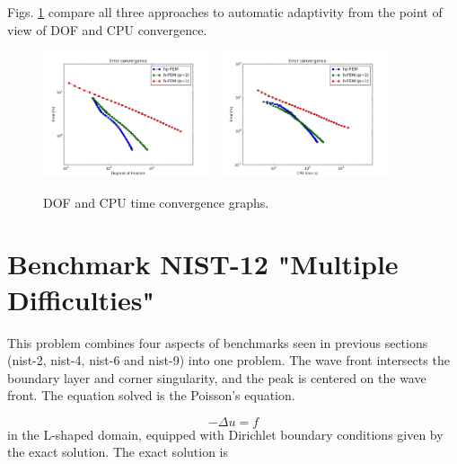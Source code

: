 \documentclass[12pt]{elsarticle}
\begin{document}
Figs. \ref{fig:nist-11-conv} compare all
three approaches to automatic adaptivity from the point
of view of DOF and CPU convergence.

\begin{figure}[H]
\centering
\vspace{-5mm}
\includegraphics[height=3.7cm]{nist/nist-11/conv_dof_aniso.png}\ \
\includegraphics[height=3.7cm]{nist/nist-11/conv_cpu_aniso.png}
\vspace{-5mm}
\caption{DOF and CPU time convergence graphs.}
\vspace{-5mm}
\label{fig:nist-11-conv}
\vspace{-2mm}
\end{figure}


\section{Benchmark NIST-12 "Multiple Difficulties"}
\label{sec:bench-12}

This problem combines four aspects of benchmarks
seen in previous sections (nist-2, nist-4, nist-6 and nist-9) into one problem.
The wave front intersects the boundary
layer and corner singularity, and the peak is centered on the wave front.
The equation solved is the Poisson's equation.

\begin{equation} \label{multiple}
-\Delta u = f
\end{equation}
in the L-shaped domain, equipped with Dirichlet boundary conditions
given by the exact solution.
The exact solution is
\end{document}
